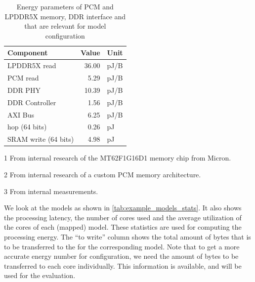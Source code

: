 \begin{table}[hbtp]
    \centering
    \begin{threeparttable}
        \begin{tabular}{@{}lrl@{}}
        \toprule
        \textbf{Component} & \textbf{Value} & \textbf{Unit} \\
        \midrule
        LPDDR5X read\tnote{1}               & 36.00 & pJ/B \\
        PCM read\tnote{2}                   & 5.29  & pJ/B \\
        DDR PHY\tnote{3}                    & 10.39 & pJ/B \\
        DDR Controller\tnote{3}             & 1.56  & pJ/B \\
        AXI Bus\tnote{3}                    & 6.25  & pJ/B \\
        \confignoc{} hop (64 bits)\tnote{3} & 0.26  & pJ   \\
        SRAM write (64 bits)\tnote{3}       & 4.98  & pJ   \\ \bottomrule
        \end{tabular}
        \begin{tablenotes}
            \item[1] From internal research of the MT62F1G16D1 memory chip from Micron.
            \item[2] From internal research of a custom PCM memory architecture.
            \item[3] From internal measurements.
        \end{tablenotes}
    \end{threeparttable}
    \caption{Energy parameters of PCM and LPDDR5X memory, DDR interface and \graicore{} that are relevant for model configuration}
    \label{tab:energy_parameters}
\end{table}

We look at the models as shown in \cref{tab:example_models_stats}.
It also shows the processing latency, the number of cores used and the average utilization of the cores of each (mapped) model.
These statistics are used for computing the processing energy.
The ``to write'' column shows the total amount of bytes that is to be transferred to the \graicore{} for the corresponding model.
Note that to get a more accurate energy number for configuration, we need the amount of bytes to be transferred to each core individually.
This information is available, and will be used for the evaluation.

